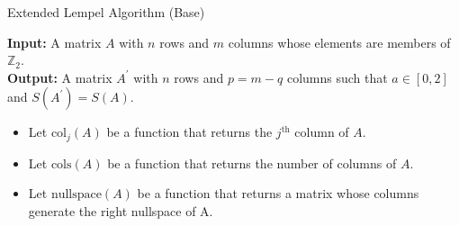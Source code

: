 \documentclass{article}
\theoremstyle{definition}
\theoremstyle{problem}
\theoremstyle{lemma}
\begin{document}
		\begin{algorithm}
			\label{al_1}
			\caption{Extended Lempel Algorithm (Base)}
			\textbf{Input:} A matrix $A$ with $n$ rows and $m$ columns whose elements are members of $\mathbb{Z}_2$.\\
			\textbf{Output:} A matrix $A^\prime$ with $n$ rows and $p = m-q$ columns such that $a\in\left[0,2\right]$ and $S(A^\prime) = S(A)$.
			\begin{itemize}
				\item Let $\text{col}_j(A)$ be a function that returns the $j^{\text{th}}$ column of $A$.
				\item Let $\text{cols}(A)$ be a function that returns the number of columns of $A$.
				\item Let $\text{nullspace}(A)$ be a function that returns a matrix whose columns generate the right nullspace of A.
			\end{itemize}
			\begin{algorithmic}[1]
				\EndIf
				\EndIf
				\EndFor
				\EndFor
				\EndProcedure
			\end{algorithmic}
		\end{algorithm}
\end{document}
